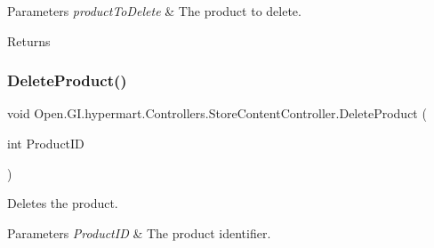 \begin{DoxyParams}{Parameters}
{\em product\+To\+Delete} & The product to delete.\\
\hline
\end{DoxyParams}
\begin{DoxyReturn}{Returns}

\end{DoxyReturn}
\hypertarget{class_open_1_1_g_i_1_1hypermart_1_1_controllers_1_1_store_content_controller_aee0d4040607c0d07828fc0d000135fcd}{}\label{class_open_1_1_g_i_1_1hypermart_1_1_controllers_1_1_store_content_controller_aee0d4040607c0d07828fc0d000135fcd} 
\subsubsection{\texorpdfstring{Delete\+Product()}{DeleteProduct()}\hspace{0.1cm}{\footnotesize\ttfamily [2/2]}}
{\footnotesize\ttfamily void Open.\+G\+I.\+hypermart.\+Controllers.\+Store\+Content\+Controller.\+Delete\+Product (\begin{DoxyParamCaption}\item[{int}]{Product\+ID }\end{DoxyParamCaption})}



Deletes the product. 


\begin{DoxyParams}{Parameters}
{\em Product\+ID} & The product identifier.\\
\hline
\end{DoxyParams}
\hypertarget{class_open_1_1_g_i_1_1hypermart_1_1_controllers_1_1_store_content_controller_ac0cf1a9777a6cb4978fbd1507dea8bbf}{}\label{class_open_1_1_g_i_1_1hypermart_1_1_controllers_1_1_store_content_controller_ac0cf1a9777a6cb4978fbd1507dea8bbf} 
